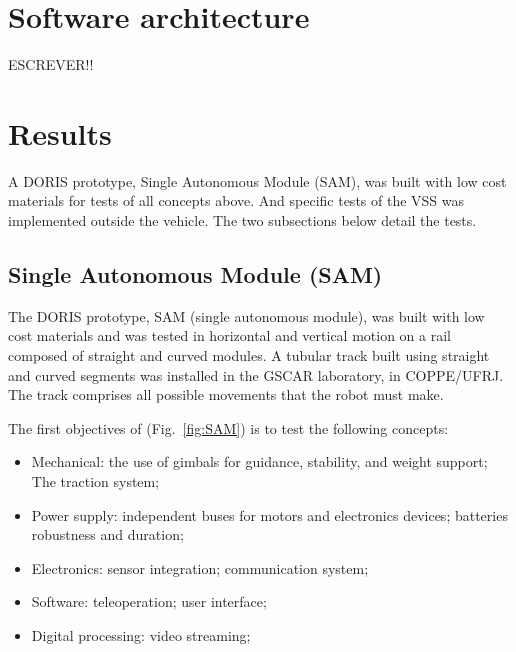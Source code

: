 \documentclass{ifacconf}
\begin{document}
\section{Software architecture}\label{sec:software_overview}
ESCREVER!!
\section{Results}\label{sec:results}
A DORIS prototype, Single Autonomous Module (SAM), was built
with low cost materials for tests of all concepts above. And specific tests of
the VSS was implemented outside the vehicle. The two subsections below detail
the tests.

\subsection{Single Autonomous Module (SAM)}

The DORIS prototype, SAM (single autonomous module), was built
with low cost materials and was tested in horizontal and vertical motion on a
rail composed of straight and curved modules. A tubular track built using
straight and curved segments was installed in the GSCAR laboratory, in
COPPE/UFRJ. The track comprises all possible movements that the robot must
make.

The first objectives of (Fig.~\ref{fig:SAM}) is to test the following concepts:
\begin{itemize}
  \item Mechanical: the use of gimbals for guidance, stability, and weight
  support; The traction system;
  \item Power supply: independent buses for motors and electronics devices;
  batteries robustness and duration;
  \item Electronics: sensor integration; communication system;
  \item Software: teleoperation; user interface;
  \item Digital processing: video streaming;
  \end{itemize}
\end{document}
